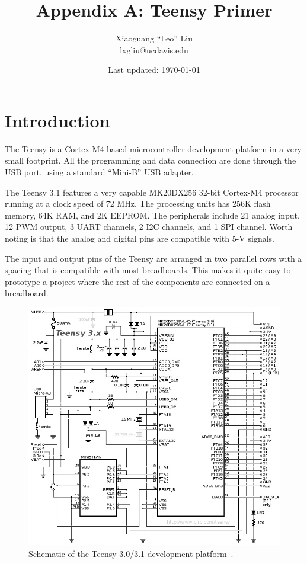 \documentclass[letterpaper, 11pt]{article}
\begin{document}
\title{Appendix A: Teensy Primer}
\author{Xiaoguang ``Leo'' Liu\\lxgliu@ucdavis.edu}
\date{Last updated: \today}

\maketitle

\section{Introduction}
The Teensy is a Cortex-M4 based microcontroller development platform in a very small footprint. All the programming and data connection are done through the USB port, using a standard ``Mini-B'' USB adapter. 

The Teensy 3.1 features a very capable MK20DX256 32-bit Cortex-M4 processor running at a clock speed of 72 MHz. The processing units has 256K flash memory, 64K RAM, and 2K EEPROM. The peripherals include 21 analog input, 12 PWM output, 3 UART channels, 2 I2C channels, and 1 SPI channel. Worth noting is that the analog and digital pins are compatible with 5-V signals. 


The input and output pins of the Teensy are arranged in two parallel rows with a spacing that is compatible with most breadboards. This makes it quite easy to prototype a project where the rest of the components are connected on a breadboard.

\begin{figure}[ht]
	\centering
	\includegraphics[width=4.5in]{teensy_sch.png}
	\caption{Schematic of the Teensy 3.0/3.1 development platform~\cite{bib:teensy_sch}.}
	\label{fig:teensy_sch}
\end{figure}
\end{document}
